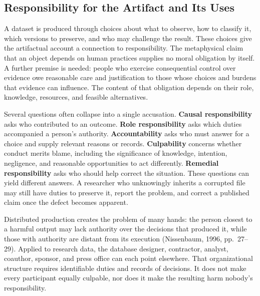 \hypertarget{M09-responsibility-for-the-artifact-and-its-uses}{%
\subsection{Responsibility for the Artifact and Its
Uses}\label{M09-responsibility-for-the-artifact-and-its-uses}}

\noindent \noindent A dataset is produced through choices about what to observe,
how to classify it, which versions to preserve, and who may challenge
the result. These choices give the artifactual account a connection to
responsibility. The metaphysical claim that an object depends on human
practices supplies no moral obligation by itself. A further premise is
needed: people who exercise consequential control over evidence owe
reasonable care and justification to those whose choices and burdens
that evidence can influence. The content of that obligation depends on
their role, knowledge, resources, and feasible alternatives.

Several questions often collapse into a single accusation.
\textbf{Causal responsibility} asks who contributed to an outcome.
\textbf{Role responsibility} asks which duties accompanied a person's
authority. \textbf{Accountability} asks who must answer for a choice and
supply relevant reasons or records. \textbf{Culpability} concerns
whether conduct merits blame, including the significance of knowledge,
intention, negligence, and reasonable opportunities to act differently.
\textbf{Remedial responsibility} asks who should help correct the
situation. These questions can yield different answers. A researcher who
unknowingly inherits a corrupted file may still have duties to preserve
it, report the problem, and correct a published claim once the defect
becomes apparent.

Distributed production creates the problem of many hands: the person
closest to a harmful output may lack authority over the decisions that
produced it, while those with authority are distant from its execution
(Nissenbaum, 1996, pp.~27--29). Applied to research data, the database
designer, contractor, analyst, coauthor, sponsor, and press office can
each point elsewhere. That organizational structure requires
identifiable duties and records of decisions. It does not make every
participant equally culpable, nor does it make the resulting harm
nobody's responsibility.

